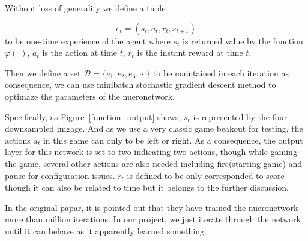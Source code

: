 \documentclass{article}
\begin{document}
Without loss of generality we define a tuple 

$$e_t = (s_t, a_t, r_t, s_{t+1})$$ to be one-time experience of the agent where $s_t$ is returned value by the function $\varphi(\cdot)$, $a_t$ is the action at time $t$, $r_t$ is the instant reward at time $t$.  

Then we define a set $\mathcal{D} = \{e_1, e_2, e_3, \cdots\}$ to be maintained in each iteration as consequence, we can use minibatch stochastic gradient descent method to optimaze the parameters of the nueronetwork.

Specifically, as Figure~\ref{function_output} shows, $s_t$ is represented by the four downsampled imgage. And as we use a very classic game beakout for testing, the actions $a_t$ in this game can only to be left or right. As a consequence, the output layer for this network is set to two indicating two actions, though while gaming the game, several other actions are also needed including fire(starting game) and pause for configuration issues. $r_t$ is defined to be only corresponded to score though it can also be related to time but it belongs to the further discussion.

In the original papar, it is pointed out that they have trained the nueronetwork more than million iterations. In our project, we just iterate through the network until it can behave as it apparently learned something.
\end{document}
